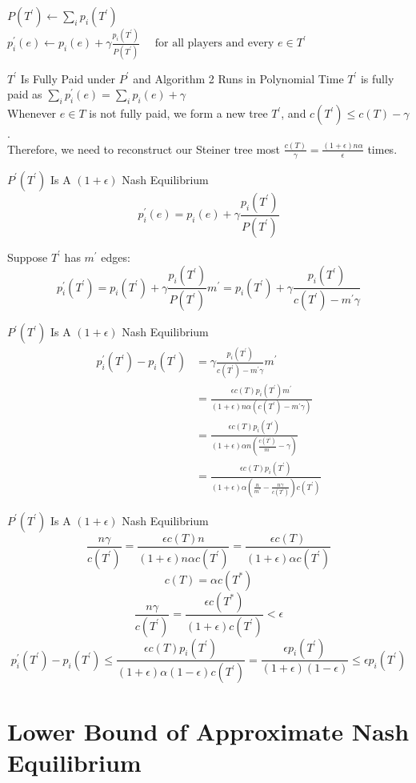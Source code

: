 \documentclass[11pt,psfig,times]{article}
\begin{document}
			$P(T^{'}) \gets \sum_i p_i(T^{'})$\\
			$p_i^{'}(e) \gets p_i(e) + \gamma\frac{p_i(T^{'})}{P(T^{'})}\quad \text{ for all players and every } e \in T^{'}$
	
	
	{$T^{'}$ Is Fully Paid under $P^{'}$ and Algorithm 2 Runs in Polynomial Time}
		$T^{'}$ is fully paid as $\sum_i p_i^{'}(e) = \sum_i p_i(e) + \gamma$\\
		
		Whenever \( e \in T \) is not fully paid, we form a new tree $T^{'}$, and $c(T^{'}) \leq c(T) - \gamma $.\\
		Therefore, we need to reconstruct our Steiner tree most  $\frac{c(T)}{\gamma} = \frac{(1+\epsilon)n\alpha }{\epsilon}$ times.
	
	
	
	{$P^{'}(T^{'})$ Is A $(1+\epsilon)$ Nash Equilibrium}
		\[p_i^{'}(e) = p_i(e) + \gamma\frac{p_i(T^{'})}{P(T^{'})}\]
		
		Suppose $T^{'}$ has $m^{'}$ edges:
		\[p_i^{'}(T^{'}) = p_i(T^{'}) + \gamma\frac{p_i(T^{'})}{P(T^{'})}m^{'} = p_i(T^{'}) + \gamma\frac{p_i(T^{'})}{c(T^{'}) - m^{'}\gamma}\]
		
	
	
	{$P^{'}(T^{'})$ Is A $(1+\epsilon)$ Nash Equilibrium}
		\begin{align*}
		p_i^{'}(T^{'}) - p_i(T^{'}) &=  \gamma\frac{p_i(T^{'})}{c(T^{'}) - m^{'}\gamma}m^{'}\\  &= \frac{\epsilon c(T) p_i(T^{'}) m^{'} }{(1+\epsilon)n\alpha(c(T^{'}) - m^{'}\gamma)}  \\ &=  \frac{\epsilon c(T) p_i(T^{'})}{(1+\epsilon)\alpha n(\frac{c(T^{'})}{m^{'}} - \gamma)} \\ &=  \frac{\epsilon c(T) p_i(T^{'})}{(1+\epsilon)\alpha (\frac{n}{m^{'}} - \frac{n\gamma}{c(T^{'})})c(T^{'})}   
		\end{align*}
	
	
	{$P^{'}(T^{'})$ Is A $(1+\epsilon)$ Nash Equilibrium}
		\[\frac{n\gamma}{c(T^{'})} = \frac{\epsilon c(T) n}{(1+\epsilon)n\alpha c(T^{'})} = \frac{\epsilon c(T) }{(1+\epsilon)\alpha c(T^{'})}\]
		\[c(T) = \alpha c(T^*)\]
		\[\frac{n\gamma}{c(T^{'})} = \frac{\epsilon c(T^*)}{(1+\epsilon)c(T^{'})} < \epsilon\]
		\[p_i^{'}(T^{'}) - p_i(T^{'}) \leq \frac{\epsilon c(T) p_i(T^{'}) }{(1+\epsilon)\alpha (1-\epsilon) c(T^{'}) } = \frac{\epsilon  p_i(T^{'}) }{(1+\epsilon) (1-\epsilon) } \leq \epsilon p_i(T^{'})\]
	
	
	
		
\section{Lower Bound of Approximate Nash Equilibrium}
	
\end{document}
